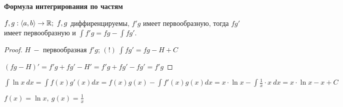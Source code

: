 \begin{theorem}
    \textbf{Формула интегрирования по частям}

    $f,g:\langle a,b \rangle \rightarrow \R;\ f,g$ диффиренцируемы, $f'g$ имеет первообразную, тогда $fg'$ имеет первообразную и $\int f'g=fg-\int fg'$.
\end{theorem}

\begin{proof}
    $H\ -$ первообразная $f'g$; $(!)\ \int fg'=fg-H+C$

    $(fg-H)'=f'g+fg'-H'=f'g+fg'-fg'=f'g$
\end{proof}

\begin{example}
    $\int \ln x\ dx = \int f(x)g'(x)dx=f(x)g(x)-\int f'(x)g(x)dx=x\cdot \ln x-\int \frac{1}{x}\cdot x\ dx=x\cdot \ln x-x+C$

    $f(x)=\ln x,\ g(x)=\frac{1}{x}$
\end{example}